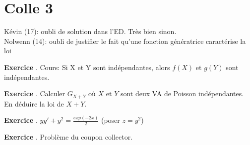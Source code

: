 \documentclass[10pt,a4paper]{article}
\newcounter{question}
\newcounter{exo}
\newenvironment{exo}{\vspace{0.5cm}\setcounter{question}{0}\addtocounter{exo}{1} \noindent \textbf{Exercice \theexo}. \normalsize }{\par}
\begin{document}
	\section*{Colle 3}
	\setcounter{exo}{0}
	Kévin (17): oubli de solution dans l'ED. Très bien sinon.\\
	Nolwenn (14): oubli de justifier le fait qu'une fonction génératrice caractérise la loi \\

	\begin{exo}
	Cours: Si X et Y sont indépendantes, alors $f ( X )$ et $g ( Y )$ sont indépendantes.
	\end{exo}

	\begin{exo}
		Calculer $G_{X + Y}$ où $X$ et $Y$ sont deux VA de Poisson indépendantes. En déduire la loi de $X + Y$.
	\end{exo}

	\begin{exo}
		$yy' + y^2 = \frac{exp(-2x)}{2}$ (poser $z = y^2$)
	\end{exo}
	
	\begin{exo}
		Problème du coupon collector.
	\end{exo}
\end{document}
